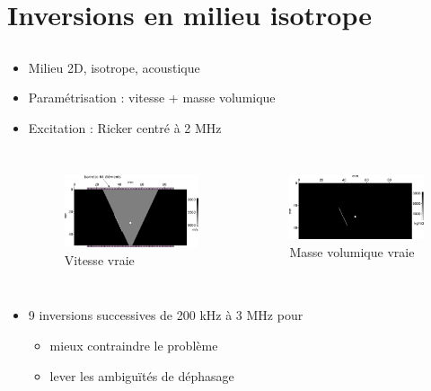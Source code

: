 \documentclass[10pt,xcolor=x11names,compress, notes=show]{beamer}%
\begin{document}
\section{Inversions en milieu isotrope}
\subsection*{}
\begin{frame}{\insertsectionhead}
	\begin{itemize}
		\item Milieu 2D, isotrope, acoustique
		\item Paramétrisation : vitesse + masse volumique
		\item Excitation : Ricker centré à 2 MHz 
	\begin{columns}
		\begin{figure}
			\includegraphics[width=\textwidth]{img/vp_true.png}\\
			{\small Vitesse vraie}
		\end{figure}
		\begin{figure}
			\includegraphics[width=\textwidth]{img/rho_true.png}\\
			{\small Masse volumique vraie}
		\end{figure}
	\end{columns}
	\vspace{1cm}
		\item 9 inversions successives de 200 kHz à 3 MHz pour
			\begin{itemize}
				\item mieux contraindre le problème
				\item lever les ambiguïtés de déphasage 
			\end{itemize}
	\end{itemize}

\end{frame}
\end{document}
